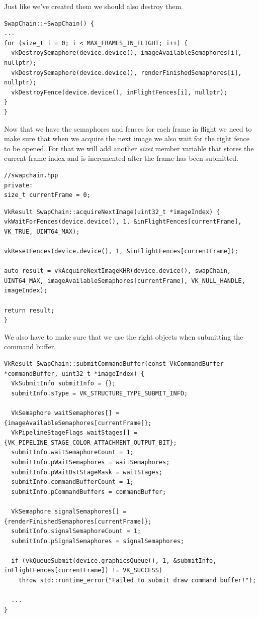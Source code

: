 \documentclass[12pt]{report} \usepackage{preamble}
\begin{document}
Just like we've created them we should also destroy them.

\begin{lstlisting}[Language=C++]
SwapChain::~SwapChain() {
...
for (size_t i = 0; i < MAX_FRAMES_IN_FLIGHT; i++) {
  vkDestroySemaphore(device.device(), imageAvailableSemaphores[i], nullptr);
  vkDestroySemaphore(device.device(), renderFinishedSemaphores[i], nullptr);
  vkDestroyFence(device.device(), inFlightFences[i], nullptr);
}
}
\end{lstlisting}

Now that we have the semaphores and fences for each frame in flight we need to make sure that when we acquire the next image we also
wait for the right fence to be opened. For that we will add another \textit{size\textunderscore t} member variable that stores the
current frame index and is incremented after the frame has been submitted.

\begin{lstlisting}[Language=C++]
//swapchain.hpp
private:
size_t currentFrame = 0;
\end{lstlisting}

\begin{lstlisting}[Language=C++]
VkResult SwapChain::acquireNextImage(uint32_t *imageIndex) {
vkWaitForFences(device.device(), 1, &inFlightFences[currentFrame], VK_TRUE, UINT64_MAX);

vkResetFences(device.device(), 1, &inFlightFences[currentFrame]);

auto result = vkAcquireNextImageKHR(device.device(), swapChain, UINT64_MAX, imageAvailableSemaphores[currentFrame], VK_NULL_HANDLE, imageIndex);

return result;
}
\end{lstlisting}

We also have to make sure that we use the right objects when submitting the command buffer.

\begin{lstlisting}[Language=C++]
VkResult SwapChain::submitCommandBuffer(const VkCommandBuffer *commandBuffer, uint32_t *imageIndex) {
  VkSubmitInfo submitInfo = {};
  submitInfo.sType = VK_STRUCTURE_TYPE_SUBMIT_INFO;

  VkSemaphore waitSemaphores[] = {imageAvailableSemaphores[currentFrame]};
  VkPipelineStageFlags waitStages[] = {VK_PIPELINE_STAGE_COLOR_ATTACHMENT_OUTPUT_BIT};
  submitInfo.waitSemaphoreCount = 1;
  submitInfo.pWaitSemaphores = waitSemaphores;
  submitInfo.pWaitDstStageMask = waitStages;
  submitInfo.commandBufferCount = 1;
  submitInfo.pCommandBuffers = commandBuffer;

  VkSemaphore signalSemaphores[] = {renderFinishedSemaphores[currentFrame]};
  submitInfo.signalSemaphoreCount = 1;
  submitInfo.pSignalSemaphores = signalSemaphores;

  if (vkQueueSubmit(device.graphicsQueue(), 1, &submitInfo, inFlightFences[currentFrame]) != VK_SUCCESS)
    throw std::runtime_error("Failed to submit draw command buffer!");

  ...
}
\end{lstlisting}
\end{document}
